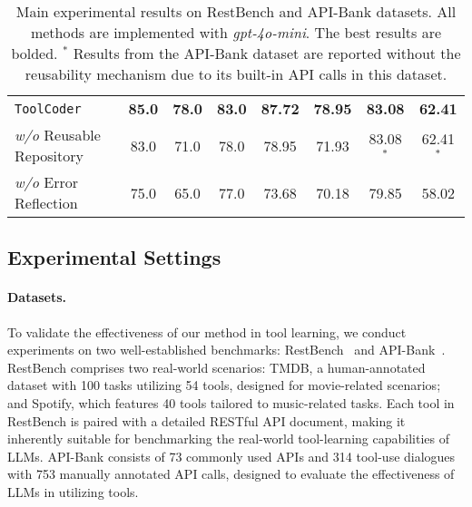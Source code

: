 \begin{table*}[t]
{\begin{tabular}{lccccccc}
\texttt{ToolCoder}    &  \textbf{85.0}  &  \textbf{78.0}   &  \textbf{83.0}  &  \textbf{87.72}   &   \textbf{78.95}  &  \textbf{83.08}  &  \textbf{62.41} \\
\quad \textit{w/o} Reusable Repository  & 83.0   & 71.0  & 78.0   &    78.95    &  71.93    &  83.08$^{*}$ &  62.41$^{*}$ \\
\quad \textit{w/o} Error Reflection  &  75.0  & 65.0  & 77.0    &    73.68    &  70.18   &  79.85  &  58.02 \\
\bottomrule
\end{tabular}}
\caption{Main experimental results on RestBench and API-Bank datasets. All methods are implemented with \textit{gpt-4o-mini}. The best results are bolded. $^*$ Results from the API-Bank dataset are reported without the reusability mechanism due to its built-in API calls in this dataset.}
\label{tab:main}
\vspace{-0.3cm}
\end{table*}

\subsection{Experimental Settings}
\paragraph{Datasets.} To validate the effectiveness of our method in tool learning, we conduct experiments on two well-established benchmarks: RestBench~\cite{DBLP:journals/corr/abs-2306-06624} and API-Bank~\cite{li-etal-2023-api}. RestBench comprises two real-world scenarios: TMDB, a human-annotated dataset with 100 tasks utilizing 54 tools, designed for movie-related scenarios; and Spotify, which features 40 tools tailored to music-related tasks. Each tool in RestBench is paired with a detailed RESTful API document, making it inherently suitable for benchmarking the real-world tool-learning capabilities of LLMs. API-Bank consists of 73 commonly used APIs and 314 tool-use dialogues with 753 manually annotated API calls, designed to evaluate the effectiveness of LLMs in utilizing tools.

